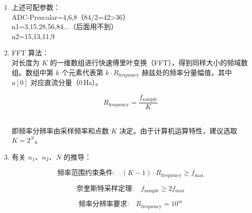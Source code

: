 \documentclass{article}
\begin{document}
\begin{enumerate}
\begin{equation}
T_{\text{maintain}} = n_1 \cdot T_{\text{ADC}}
\end{equation}

\begin{equation}
T_{\text{resolution}} = n_2 \cdot T_{\text{ADC}} \quad (\text{各自时长} = \text{周期数} \cdot \text{ADC单周期时长})
\end{equation}

\begin{equation}
T_{\text{sample}} = (n_1 + n_2) \cdot T_{\text{ADC}}
\end{equation}

\begin{equation}
f_{\text{sample}} = \frac{f_{\text{ADC}}}{(n_1 + n_2)}
\end{equation}

\item 上述可配参数：
\\ADC-Prescalar=4,6,8（84/2=42>36）
\\n1=3,15,28,56,84...（后面用不到）
\\n2=15,13,11,9

\item FFT 算法：
\\对长度为 $K$ 的一维数组进行快速傅里叶变换（FFT），得到同样大小的频域数组。数组中第 $k$ 个元素代表第 $k \cdot R_{\text{frequency}}$ 赫兹处的频率分量幅值，其中 $a[0]$ 对应直流分量（0\,Hz）。

\begin{equation}
R_{\text{frequency}} = \frac{f_{\text{sample}}}{K}
\end{equation}

\\即频率分辨率由采样频率和点数 $K$ 决定。由于计算机运算特性，建议选取 $K = 2^N$。

\item 有关 $n_1$、$n_2$、$N$ 的推导：

\begin{equation}
\text{频率范围约束条件:} \quad (K - 1) \cdot R_{\text{frequency}} \geq f_{\text{max}}
\end{equation}

\begin{equation}
\text{奈奎斯特采样定理:} \quad f_{\text{sample}} \geq 2 f_{\text{max}}
\end{equation}

\begin{equation}
\text{频率分辨率要求:} \quad R_{\text{frequency}} = 10^m
\end{equation}


\end{enumerate}
\end{document}
